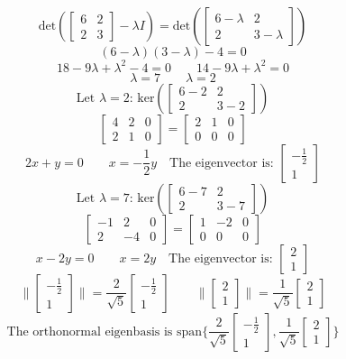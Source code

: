 \documentclass[hidelinks]{article}
\begin{document}
\[
	\text{det}(\begin{bmatrix} 6 & 2 \\ 2 & 3\end{bmatrix} - \lambda I) = \text{det}(\begin{bmatrix} 6 -\lambda & 2 \\ 2 & 3 -\lambda \end{bmatrix})
\]
\[
	(6-\lambda)(3-\lambda) - 4 = 0 
\]
\[
	18 - 9\lambda + \lambda^2 - 4 = 0 \quad \quad 14 -9\lambda + \lambda^2 = 0
\]
\[
	\lambda = 7 \quad \quad \lambda = 2
\]
\[
	\text{Let $\lambda = 2$: ker}(\begin{bmatrix} 6 - 2 & 2 \\ 2 & 3 -2 \end{bmatrix})
\]
\[
	\begin{bmatrix} 4 & 2 & 0 \\ 2 & 1 & 0 \end{bmatrix} =  \begin{bmatrix} 2 & 1 & 0 \\ 0 & 0 & 0 \end{bmatrix}
\]
\[
	2x + y = 0 \quad \quad x = -\frac{1}{2}y \quad \text{The eigenvector is: }\begin{bmatrix} -\frac{1}{2} \\ 1 \end{bmatrix}
\]
\[
	\text{Let $\lambda = 7$: ker}(\begin{bmatrix} 6 - 7 & 2 \\ 2 & 3 -7 \end{bmatrix})
\]
\[
	\begin{bmatrix} -1 & 2 & 0 \\ 2 & -4 & 0 \end{bmatrix} =  \begin{bmatrix} 1 & -2 & 0 \\ 0 & 0 & 0 \end{bmatrix}
\]
\[
	x - 2y = 0 \quad \quad x = 2y \quad \text{The eigenvector is: }\begin{bmatrix} 2 \\ 1 \end{bmatrix}
\]
\[
	\| \begin{bmatrix} -\frac{1}{2} \\ 1 \end{bmatrix}\| = \frac{2}{\sqrt{5}} \begin{bmatrix} -\frac{1}{2} \\ 1 \end{bmatrix} \quad \quad 	\| \begin{bmatrix} 2 \\ 1 \end{bmatrix}\| = \frac{1}{\sqrt{5}} \begin{bmatrix} 2 \\ 1 \end{bmatrix}
\]
\[
	\text{The orthonormal eigenbasis is span} \{ \frac{2}{\sqrt{5}} \begin{bmatrix} -\frac{1}{2} \\ 1 \end{bmatrix}, \frac{1}{\sqrt{5}} \begin{bmatrix} 2 \\ 1 \end{bmatrix}
\}
\]
\end{document}
